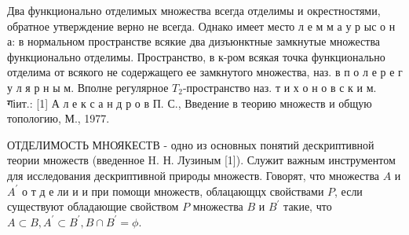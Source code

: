 \documentclass[10pt]{article}
\begin{document}
Два функционально отделимых множества всегда отделимы и окрестностями, обратное утверждение верно не всегда. Однако имеет место л е м м а у р ыс о н а: в нормальном пространстве всякие два дизъюнктные замкнутые множества функционально отделимы. Пространство, в к-ром всякая точка функционально отделима от всякого не содержащего ее замкнутого множества, наз. в п о л е р е г у л я р н ы м. Вполне регулярное $T_{2}$-пространство наз. т и х о н о в с к и м. गіит.: [1] А л е к с а н д р о в П. С., Введение в теорию множеств и общую топологию, М., 1977.

ОТДЕЛИМОСТЬ МНОЯКЕСТВ - одно из основных понятий дескриптивной теории множеств (введенное H. Н. Лузиным [1]). Служит важным инструментом для исследования дескриптивной природы множеств. Говорят, что множества $A$ и $A^{\prime}$ о т д е ли и и при помощи множеств, облацающцх свойствами $P$, если существуют обладающие свойством $P$ множества $B$ и $B^{\prime}$ такие, что $A \subset B, A^{\prime} \subset B^{\prime}, B \cap B^{\prime}=\phi$.
\end{document}

